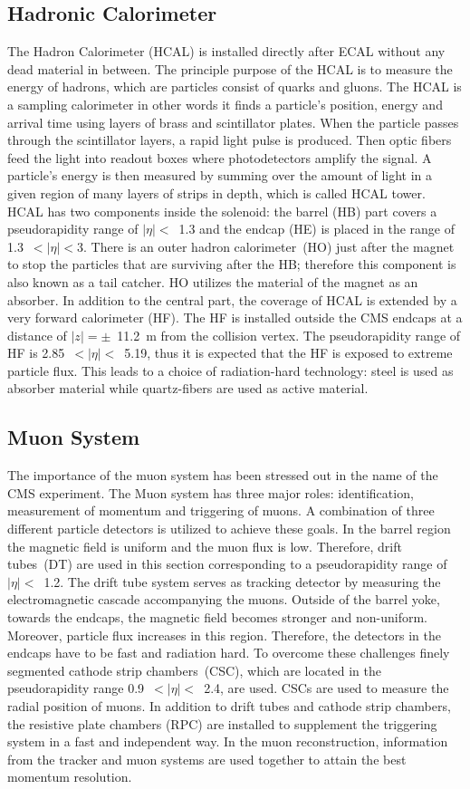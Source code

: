\subsection{Hadronic Calorimeter}
The Hadron Calorimeter (HCAL) is installed directly after ECAL without any dead material in between.
The principle purpose of the HCAL is to measure the energy of hadrons, which are particles consist of quarks and gluons.
The HCAL is a sampling calorimeter in other words it finds a particle’s position, energy and arrival time using layers of brass and scintillator plates. When the particle passes through the scintillator layers, a rapid light pulse is produced. Then optic fibers feed the light into readout boxes where photodetectors amplify the signal. A particle’s energy is then measured by summing over the amount of light in a given region of many layers of strips in depth, which is called HCAL tower.
HCAL has two components inside the solenoid: the barrel (HB) part covers a pseudorapidity range of $|\eta|<$~1.3 and the endcap (HE) is placed in the range of 1.3~$<|\eta|<$3. There is an outer hadron calorimeter~(HO) just after the magnet to stop the particles that are surviving after the HB; therefore this component is also known as a tail catcher. HO utilizes the material of the magnet as an absorber. In addition to the central part, the coverage of HCAL is extended by a very forward calorimeter (HF). The HF is installed outside the CMS endcaps at a distance of $|z|=\pm$~11.2~m from the collision vertex. The pseudorapidity range of HF is 2.85~$<|\eta|<$~5.19, thus it is expected that the HF is exposed to extreme particle flux. This leads to a choice of radiation-hard technology: steel is used as absorber material while quartz-fibers are used as active material.
\subsection{Muon System}
The importance of the muon system has been stressed out in the name of the CMS experiment.
The Muon system has three major roles: identification, measurement of momentum and triggering of muons. A combination of three different particle detectors is utilized to achieve these goals. In the barrel region the magnetic field is uniform and the muon flux is low. Therefore, drift tubes~(DT) are used in this section corresponding to a pseudorapidity range of $|\eta|<$~1.2. The drift tube system serves as tracking detector by measuring the electromagnetic cascade accompanying the muons. Outside of the barrel yoke, towards the endcaps, the magnetic field becomes stronger and non-uniform. Moreover, particle flux increases in this region. Therefore, the detectors in the endcaps have to be fast and radiation hard. To overcome these challenges finely segmented cathode strip chambers~(CSC), which are located in the pseudorapidity range 0.9~$<|\eta|<$~2.4, are used. CSCs are used to measure the radial position of muons. In addition to drift tubes and cathode strip chambers, the resistive plate chambers (RPC) are installed to supplement the triggering system in a fast and independent way.
In the muon reconstruction, information from the tracker and muon systems are used together to attain the best momentum resolution. 
